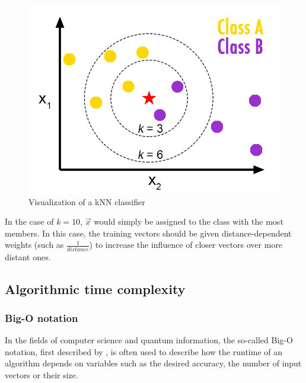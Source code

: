 \begin{figure}[H]
      \centering
       \includegraphics[scale=0.8]{img/knn-concept.png}
       \caption[]{\label{fig:knnconcept} Visualization of a kNN classifier\footnotemark[4]}
\end{figure}


In the case of $k = 10$, $\vec{x}$ would simply be assigned to the class with the most members. In this case, the training vectors should be given distance-dependent weights (such as $\frac{1}{distance}$) to increase the influence of closer vectors over more distant ones.

\subsection{Algorithmic time complexity}
\label{subsubsec:algcomplexity}

\subsubsection{Big-O notation}
\label{subsubsubsec:bigO}

In the fields of computer science and quantum information, the so-called Big-O notation, first described by , is often used to describe how the runtime of an algorithm depends on variables such as the desired accuracy, the number of input vectors or their size.

